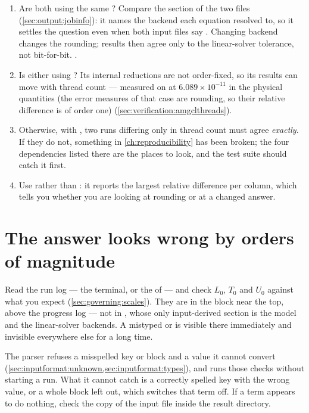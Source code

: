 \begin{enumerate}
  \item Are both using the same ? Compare the
     section of the two
     files (\cref{sec:output:jobinfo}): it names the backend
    each equation resolved to, so it settles the question even when both input
    files say . Changing backend changes the rounding; results then
    agree only to the linear-solver tolerance, not bit-for-bit.
    .
  \item Is either using ? Its internal reductions are not
    order-fixed, so its results can move with thread count --- measured on
     at $6.089\times10^{-11}$ in the physical quantities
    (the error measures of that case are rounding, so their relative
    difference is of order one)
    (\cref{sec:verification:amgclthreads}).
  \item Otherwise, with , two runs differing
    only in thread count must agree \emph{exactly}. If they do not, something
    in \cref{ch:reproducibility} has been broken; the four dependencies listed
    there are the places to look, and the test suite should catch it first.
  \item Use  rather than : it reports the
    largest relative difference per column, which tells you whether you are
    looking at rounding or at a changed answer.
\end{enumerate}

\section{The answer looks wrong by orders of magnitude}
\label{sec:trouble:scales}

Read the run log --- the terminal, or the  of
 --- and check $L_0$, $T_0$ and $U_0$ against what you
expect (\cref{sec:governing:scales}). They are in the 
block near the top, above the progress log --- not in , whose
only input-derived section is the model and the linear-solver backends. A
mistyped
 or
 is visible there immediately and
invisible everywhere else for a long time.

The parser refuses a misspelled key or block and a value it cannot convert
(\cref{sec:inputformat:unknown,sec:inputformat:types}), and
 runs those checks without starting a run. What
it cannot catch is a correctly spelled key with the wrong value, or a whole
\key{[Physics.*]} block left out, which switches that term off. If a term
appears to do nothing, check the copy of the input file inside the result
directory.

